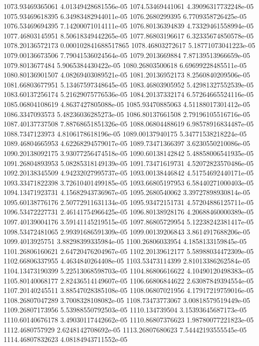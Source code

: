 {1073.93469365061 4.01349428681556e-05
1074.53469441061 4.39096317732248e-05
1075.93469618395 6.34983482944011e-05
1076.2680299395 6.7709358726425e-05
1076.53469694395 7.14200071014111e-05
1076.80136394839 4.73329461558994e-05
1077.46803145951 8.50618349442265e-05
1077.86803196617 6.32335674850578e-05
1078.20136572173 0.000102841688517865
1078.46803272617 5.18771073041223e-05
1079.00136673506 7.79041536024564e-05
1079.2013669884 7.87139513966659e-05
1079.8013677484 5.9065384430422e-05
1080.26803500618 6.69699228485511e-05
1080.80136901507 4.08269403089521e-05
1081.20136952173 8.2560840209506e-05
1081.66803677951 5.13467597348645e-05
1083.46803905952 5.42981327552539e-05
1083.60137256174 5.21629075776536e-05
1084.20137332174 6.57264665524116e-05
1085.06804108619 4.8637427805088e-05
1085.93470885063 4.51188017301412e-05
1086.3347093573 5.48236036285273e-05
1086.80137661508 2.79196105516716e-05
1087.40137737508 7.88768651851326e-05
1088.06804488619 6.98578916834487e-05
1088.7347123973 4.8106178618196e-05
1089.00137940175 5.34771538218224e-05
1089.46804665953 4.62268294579017e-05
1089.73471366397 3.6230550210086e-05
1090.20138092175 3.93077256474518e-05
1090.60138142842 5.48858006541935e-05
1091.26804893953 5.08285318149139e-05
1091.73471619731 4.52072823570486e-05
1092.20138345509 4.94232027995737e-05
1093.00138446842 4.51754692440171e-05
1093.33471822398 3.72610401499185e-05
1093.66805197953 6.58440271000403e-05
1094.13471923731 4.15682943736967e-05
1095.2680540062 3.39727898930814e-05
1095.60138776176 2.50772911631134e-05
1095.93472151731 4.57204886125711e-05
1096.53472227731 2.46141754966425e-05
1096.80138928176 4.20688460000389e-05
1097.40139004176 3.59141145219515e-05
1097.86805729954 5.12238242381417e-05
1098.53472481065 2.99391686591309e-05
1099.00139206843 3.8614917688206e-05
1099.4013925751 3.88298399335984e-05
1100.26806033954 4.1858133159845e-05
1101.26806160621 2.64720476204967e-05
1102.20139612177 5.58988034472309e-05
1102.66806337955 4.4634840264408e-05
1103.53473114399 2.81013386262584e-05
1104.13473190399 5.22513068598703e-05
1104.86806616622 4.10490120498383e-05
1105.80140068177 2.82436514149607e-05
1106.66806844622 2.63087849394554e-05
1107.20140245511 3.88547028385108e-05
1108.06807021956 4.17917219759016e-05
1108.26807047289 3.7008328108082e-05
1108.73473773067 3.00818579519449e-05
1109.26807173956 5.53988550792503e-05
1110.134739504 3.15393645687173e-05
1110.60140676178 3.49030117442662e-05
1110.86807376623 1.98780077221823e-05
1112.4680757929 2.6248142708692e-05
1113.26807680623 7.54442193555545e-05
1114.46807832623 4.08184943711552e-05
}
